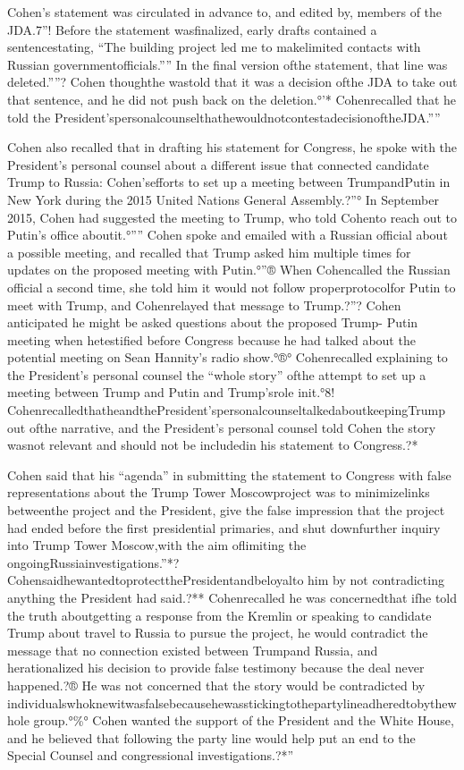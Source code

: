 Cohen’s statement was circulated in advance to, and edited by, members of the JDA.7”! Before the statement wasfinalized, early drafts contained a sentencestating, “The building project led me to makelimited contacts with Russian governmentofficials.”” In the final version ofthe statement, that line was deleted.””? Cohen thoughthe wastold that it was a decision ofthe JDA to take out that sentence, and he did not push back on the deletion.°’* Cohenrecalled that he told the President’spersonalcounselthathewouldnotcontestadecisionoftheJDA.””

Cohen also recalled that in drafting his statement for Congress, he spoke with the President’s personal counsel about a different issue that connected candidate Trump to Russia: Cohen’sefforts to set up a meeting between TrumpandPutin in New York during the 2015 United Nations General Assembly.?”° In September 2015, Cohen had suggested the meeting to Trump, who told Cohento reach out to Putin’s office aboutit.°”” Cohen spoke and emailed with a Russian official about a possible meeting, and recalled that Trump asked him multiple times for updates on the proposed meeting with Putin.°”® When Cohencalled the Russian official a second time, she told him it would not follow properprotocolfor Putin to meet with Trump, and Cohenrelayed that message to Trump.?”? Cohen anticipated he might be asked questions about the proposed Trump- Putin meeting when hetestified before Congress because he had talked about the potential meeting on Sean Hannity’s radio show.°®° Cohenrecalled explaining to the President’s personal counsel the “whole story” ofthe attempt to set up a meeting between Trump and Putin and Trump’srole init.°8! CohenrecalledthatheandthePresident’spersonalcounseltalkedaboutkeepingTrump out ofthe narrative, and the President’s personal counsel told Cohen the story wasnot relevant and should not be includedin his statement to Congress.?*

Cohen said that his “agenda” in submitting the statement to Congress with false representations about the Trump Tower Moscowproject was to minimizelinks betweenthe project and the President, give the false impression that the project had ended before the first presidential primaries, and shut downfurther inquiry into Trump Tower Moscow,with the aim oflimiting the ongoingRussiainvestigations.”*? CohensaidhewantedtoprotectthePresidentandbeloyalto him by not contradicting anything the President had said.?** Cohenrecalled he was concernedthat ifhe told the truth aboutgetting a response from the Kremlin or speaking to candidate Trump about travel to Russia to pursue the project, he would contradict the message that no connection existed between Trumpand Russia, and herationalized his decision to provide false testimony because the deal never happened.?® He was not concerned that the story would be contradicted by individualswhoknewitwasfalsebecausehewasstickingtothepartylineadheredtobythewhole group.°\%° Cohen wanted the support of the President and the White House, and he believed that following the party line would help put an end to the Special Counsel and congressional investigations.?*”

